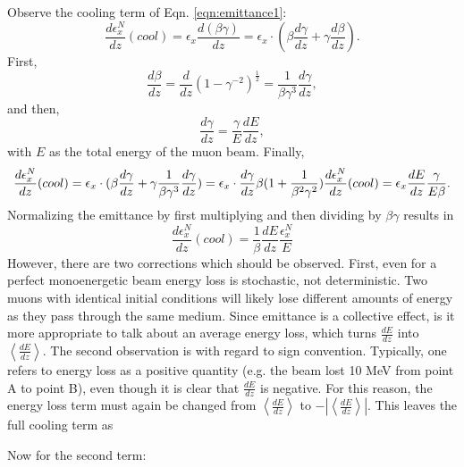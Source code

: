 Observe the cooling term of Eqn. \ref{eqn:emittance1}:
\begin{equation} \nonumber
\frac{d\epsilon_x^N}{dz}(cool)=\epsilon_x\frac{d(\beta\gamma)}{dz}=\epsilon_x\cdot(\beta\frac{d\gamma}{dz}+\gamma\frac{d\beta}{dz}).
\end{equation}
First,
\begin{equation} \nonumber
\frac{d\beta}{dz}=\frac{d}{dz}(1-\gamma^{-2})^{\frac{1}{2}}=\frac{1}{\beta\gamma^3}\frac{d\gamma}{dz},
\end{equation}
and then,
\begin{equation} \nonumber
\frac{d\gamma}{dz}=\frac{\gamma}{E}\frac{dE}{dz},
\end{equation}
with $E$ as the total energy of the muon beam. Finally,
\begin{equation} \nonumber
\frac{d\epsilon_x^N}{dz}(cool)=\epsilon_x\cdot(\beta\frac{d\gamma}{dz}+\gamma\frac{1}{\beta\gamma^3}\frac{d\gamma}{dz})=\epsilon_x\cdot\frac{d\gamma}{dz}\beta(1+\frac{1}{\beta^2\gamma^2}) \vspace*{12pt}
\frac{d\epsilon_x^N}{dz}(cool)=\epsilon_x\frac{dE}{dz}\frac{\gamma}{E\beta}.
\end{equation}
Normalizing the emittance by first multiplying and then dividing by $\beta\gamma$ results in
\begin{equation} \nonumber
\frac{d\epsilon_x^N}{dz}(cool)=\frac{1}{\beta}\frac{dE}{dz}\frac{\epsilon_x^N}{E}
\end{equation}
However, there are two corrections which should be observed. First, even for a perfect monoenergetic beam energy loss is stochastic, not deterministic. Two muons with identical initial conditions will likely lose different amounts of energy as they pass through the same medium. Since emittance is a collective effect, is it more appropriate to talk about an average energy loss, which turns $\frac{dE}{dz}$ into $\left<\frac{dE}{dz}\right>$. The second observation is with regard to sign convention. Typically, one refers to energy loss as a positive quantity (e.g. the beam lost 10 MeV from point A to point B), even though it is clear that $\frac{dE}{dz}$ is negative. For this reason, the energy loss term must again be changed from $\left<\frac{dE}{dz}\right>$ to  $-\left|\left<\frac{dE}{dz}\right>\right|$. This leaves the full cooling term as






\fi

Now for the second term:

